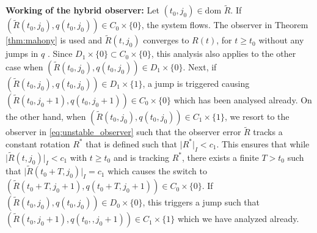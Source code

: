 \documentclass{article}
\newcommand{\dom}{\text{dom }}
\newcommand{\textblue}[1]{\textcolor{blue}{#1}}
\newcommand{\Rtilde}{\tilde{R}}
\newcommand{\normSOthree}[1]{{{\vert}#1 {\vert}_I}}
\begin{document}
\textbf{Working of the hybrid observer: } Let $(t_0, j_0)\in \dom \Rtilde$. If ${(\Rtilde(t_0,j_0), q(t_0, j_0))}\in C_0\times \{0\}$, the system flows. The observer in Theorem \ref{thm:mahony} is used and  $\Rtilde(t, j_0)$ converges to $R(t)$, for $t\geq t_0$ without any jumps in $q$ . Since $D_1\times \{0\}\subset C_0\times \{0\}$, this analysis also applies to the other case when $(\Rtilde(t_0, j_0), q(t_0, j_0))\in D_1\times \{0\}$. Next, if $(\Rtilde(t_0, j_0), q(t_0, j_0))\in D_1\times \{1\}$, a jump is triggered causing $(\Rtilde(t_0, j_0+1), q(t_0, j_0+1))\in C_0\times \{0\}$ which has been analysed already. On the other hand, when $(\Rtilde(t_0, j_0), q(t_0, j_0))\in C_1\times \{1\}$, we resort to the observer in \eqref{eq:unstable_observer} such that the observer error $\Rtilde$ tracks a constant rotation $R^*$ that is defined such that $\normSOthree{R^*} < c_1$. This ensures that while ${\normSOthree{\Rtilde(t,j_0)} < c_1}$ with $t\geq t_0$ and is tracking $R^*$, there exists a finite $T>t_0$ such that ${\normSOthree{\Rtilde(t_0 + T,j_0)} = c_1}$ which causes the switch to ${(\Rtilde(t_0 + T, j_0 + 1), q(t_0 + T, j_0 + 1))}\in C_0\times \{0\}$. If ${(\Rtilde(t_0, j_0), q(t_0, j_0))}\in D_0\times \{0\}$, this triggers a jump such that ${(\Rtilde(t_0, j_0 + 1), q(t_0,, j_0+1))}\in C_1 \times \{1\}$ which we have analyzed already.


\end{document}
